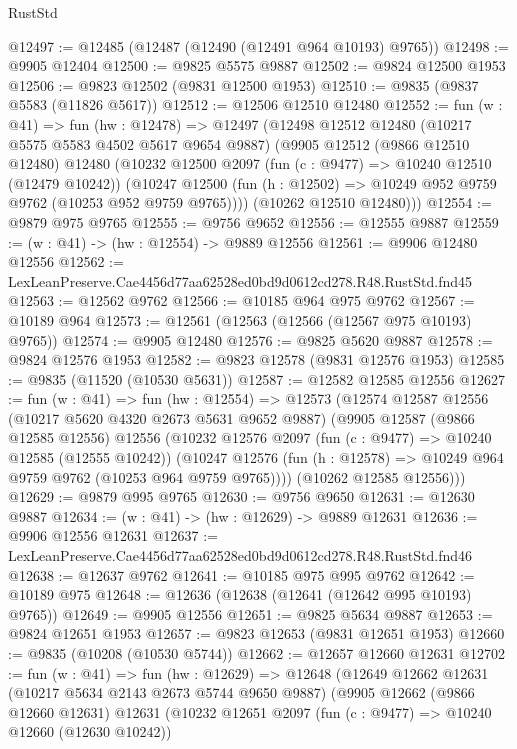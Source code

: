 \begin{lexlean}{RustStd}
\begin{coremodule}
@12497 := @12485 (@12487 (@12490 (@12491 @964 @10193) @9765))
@12498 := @9905 @12404
@12500 := @9825 @5575 @9887
@12502 := @9824 @12500 @1953
@12506 := @9823 @12502 (@9831 @12500 @1953)
@12510 := @9835 (@9837 @5583 (@11826 @5617))
@12512 := @12506 @12510 @12480
@12552 := fun (w : @41) =>
  fun (hw : @12478) =>
  @12497
    (@12498
      @12512
      @12480
      (@10217 @5575 @5583 @4502 @5617 @9654 @9887)
      (@9905
        @12512
        (@9866 @12510 @12480)
        @12480
        (@10232
          @12500
          @2097
          (fun (c : @9477) => @10240 @12510 (@12479 @10242))
          (@10247 @12500 (fun (h : @12502) => @10249 @952 @9759 @9762 (@10253 @952 @9759 @9765))))
        (@10262 @12510 @12480)))
@12554 := @9879 @975 @9765
@12555 := @9756 @9652
@12556 := @12555 @9887
@12559 := (w : @41) -> (hw : @12554) -> @9889 @12556
@12561 := @9906 @12480 @12556
@12562 := LexLeanPreserve.Cae4456d77aa62528ed0bd9d0612cd278.R48.RustStd.fnd45
@12563 := @12562 @9762
@12566 := @10185 @964 @975 @9762
@12567 := @10189 @964
@12573 := @12561 (@12563 (@12566 (@12567 @975 @10193) @9765))
@12574 := @9905 @12480
@12576 := @9825 @5620 @9887
@12578 := @9824 @12576 @1953
@12582 := @9823 @12578 (@9831 @12576 @1953)
@12585 := @9835 (@11520 (@10530 @5631))
@12587 := @12582 @12585 @12556
@12627 := fun (w : @41) =>
  fun (hw : @12554) =>
  @12573
    (@12574
      @12587
      @12556
      (@10217 @5620 @4320 @2673 @5631 @9652 @9887)
      (@9905
        @12587
        (@9866 @12585 @12556)
        @12556
        (@10232
          @12576
          @2097
          (fun (c : @9477) => @10240 @12585 (@12555 @10242))
          (@10247 @12576 (fun (h : @12578) => @10249 @964 @9759 @9762 (@10253 @964 @9759 @9765))))
        (@10262 @12585 @12556)))
@12629 := @9879 @995 @9765
@12630 := @9756 @9650
@12631 := @12630 @9887
@12634 := (w : @41) -> (hw : @12629) -> @9889 @12631
@12636 := @9906 @12556 @12631
@12637 := LexLeanPreserve.Cae4456d77aa62528ed0bd9d0612cd278.R48.RustStd.fnd46
@12638 := @12637 @9762
@12641 := @10185 @975 @995 @9762
@12642 := @10189 @975
@12648 := @12636 (@12638 (@12641 (@12642 @995 @10193) @9765))
@12649 := @9905 @12556
@12651 := @9825 @5634 @9887
@12653 := @9824 @12651 @1953
@12657 := @9823 @12653 (@9831 @12651 @1953)
@12660 := @9835 (@10208 (@10530 @5744))
@12662 := @12657 @12660 @12631
@12702 := fun (w : @41) =>
  fun (hw : @12629) =>
  @12648
    (@12649
      @12662
      @12631
      (@10217 @5634 @2143 @2673 @5744 @9650 @9887)
      (@9905
        @12662
        (@9866 @12660 @12631)
        @12631
        (@10232
          @12651
          @2097
          (fun (c : @9477) => @10240 @12660 (@12630 @10242))

\end{coremodule}
\end{lexlean}
